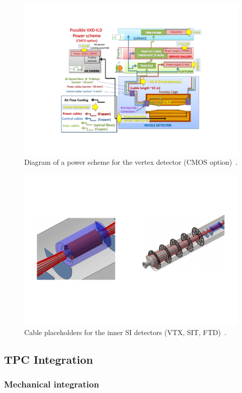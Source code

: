 \begin{figure}[h!]
    \centering
        \includegraphics[width=0.8\hsize]{Integration/fig/VTX_services.pdf}
    \caption{Diagram of a power scheme for the vertex detector (CMOS option)~\cite{ild:bib:VTX_integration}.}
    \label{ILD:fig:vtx_services}
\end{figure}

\begin{figure}[h!]
    \centering
        \includegraphics[width=0.8\hsize]{Integration/fig/SI_Services.pdf}
    \caption{Cable placeholders for the inner SI detectors (VTX, SIT, FTD)~\cite{ild:bib:SI_integration}.}
    \label{ILD:fig:si_services}
\end{figure}

\subsection{TPC Integration}

\subsubsection{Mechanical integration}


